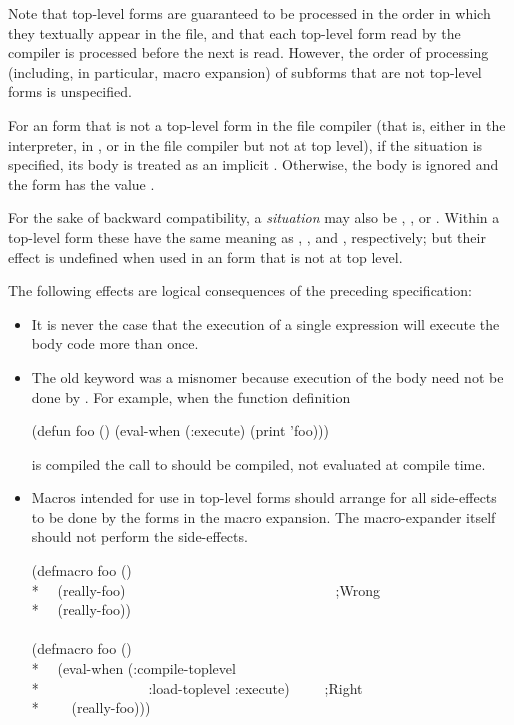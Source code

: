 \begin{defspec}
  Note that top-level forms are guaranteed to be processed in the order
  in which they textually appear in the file, and that each top-level
  form read by the compiler is processed before the next is read.
  However, the order of processing (including, in particular, macro
  expansion) of subforms that are not top-level forms is unspecified.

  For an  form that is not a top-level form in the file compiler
  (that is, either in the interpreter, in , or in the file
  compiler but not at top level), if the  situation is specified,
  its body is treated as an implicit .  Otherwise, the body
  is ignored and the  form has the value .

  For the sake of backward compatibility,
  a \emph{situation} may also be , , or .
  Within a top-level  form
  these have the same meaning as , ,
  and , respectively; but their effect is undefined when used
  in an  form that is not at top level.

  The following effects are logical consequences of the preceding specification:

  \begin{itemize}
   \item It is never the case that the execution of a single 
     expression will execute the body code more than once.

   \item The old keyword  was a misnomer because execution of
     the body need not be done by .  For example, when the
     function definition
     \begin{lisp}
     (defun foo () (eval-when (:execute) (print 'foo)))
     \end{lisp}
     is compiled
     the call to  should be compiled, not evaluated at compile time.

   \item Macros intended for use in top-level forms should arrange for all
     side-effects to be done by the forms in the macro expansion.
     The macro-expander itself should not perform the side-effects.

\begin{lisp}
(defmacro foo () \\*
~~(really-foo)~~~~~~~~~~~~~~~~~~~~~~~~~~~~~~;{\rm Wrong}\\*
~~{\Xbq}(really-foo)) \\
\\
(defmacro foo () \\*
~~{\Xbq}(eval-when (:compile-toplevel \\*
~~~~~~~~~~~~~~~:load-toplevel :execute)~~~~~;{\rm Right} \\*
~~~~(really-foo)))
\end{lisp}


\end{itemize}
\end{defspec}
